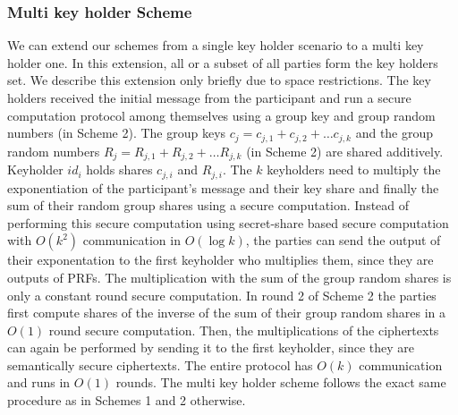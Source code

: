 \subsubsection{Multi key holder Scheme} \label{Multi-Key-Holder}
We can extend our schemes from a single key holder scenario to a multi key holder one. In this extension, all or a subset of all parties form the key holders set. 
We describe this extension only briefly due to space restrictions.
The key holders received the initial message from the participant and run a secure computation protocol among themselves using a group key and group random numbers (in Scheme 2).
The group keys $c_j = c_{j,1} + c_{j,2} + \ldots c_{j,k}$ and the group random numbers $R_j = R_{j,1} + R_{j,2} + \ldots R_{j,k}$ (in Scheme 2) are shared additively.
Keyholder $id_i$ holds shares $c_{j,i}$ and $R_{j,i}$.
The $k$ keyholders need to multiply the exponentiation of the participant's message and their key share and finally the sum of their random group shares using a secure computation.
Instead of performing this secure computation using secret-share based secure computation with $O(k^2)$ communication in $O(\log{k})$, the parties can send the output of their exponentation to the first keyholder who multiplies them, since they are outputs of PRFs.
The multiplication with the sum of the group random shares is only a constant round secure computation.
In round 2 of Scheme 2 the parties first compute shares of the inverse of the sum of their group random shares in a $O(1)$ round secure computation.
Then, the multiplications of the ciphertexts  can again be performed by sending it to the first keyholder, since they are semantically secure ciphertexts.
The entire protocol has $O(k)$ communication and runs in $O(1)$ rounds.
The multi key holder scheme follows the exact same procedure as in Schemes 1 and 2 otherwise. 

